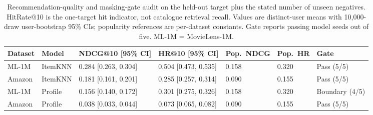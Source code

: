 \begin{table}[!htbp]
\centering\scriptsize
\setlength{\tabcolsep}{2.5pt}
\caption{Recommendation-quality and masking-gate audit on the held-out target plus the stated number of unseen negatives. HitRate@10 is the one-target hit indicator, not catalogue retrieval recall. Values are distinct-user means with 10,000-draw user-bootstrap 95\% CIs; popularity references are per-dataset constants. Gate reports passing model seeds out of five. ML-1M = MovieLens-1M.}
\label{tab:recommendation-quality}
\begin{tabular}{@{}lllllll@{}}
\toprule
Dataset & Model & NDCG@10 [95\% CI] & HR@10 [95\% CI] & Pop.\ NDCG & Pop.\ HR & Gate \\
\midrule
ML-1M & ItemKNN & 0.284 [0.263, 0.304] & 0.504 [0.473, 0.535] & 0.158 & 0.320 & Pass (5/5) \\
Amazon & ItemKNN & 0.181 [0.161, 0.201] & 0.285 [0.257, 0.314] & 0.090 & 0.155 & Pass (5/5) \\
ML-1M & Profile & 0.156 [0.140, 0.172] & 0.301 [0.275, 0.326] & 0.158 & 0.320 & Boundary (4/5) \\
Amazon & Profile & 0.038 [0.033, 0.044] & 0.073 [0.065, 0.082] & 0.090 & 0.155 & Pass (5/5) \\
\bottomrule
\end{tabular}
\end{table}